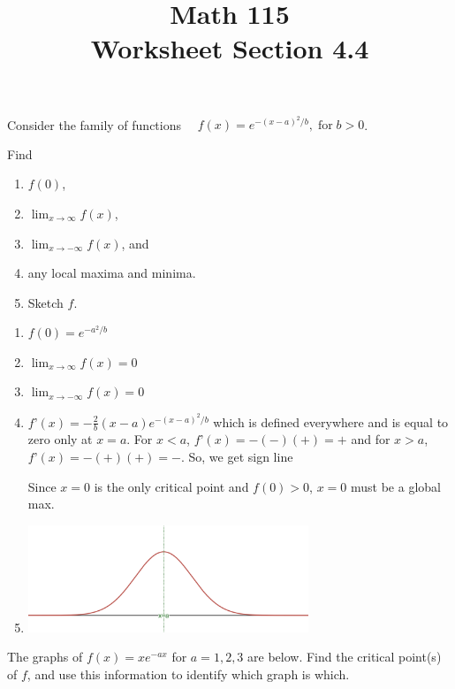 \documentclass[11pt]{exam}
\title{\vspace{-0.5in} Math 115 \\ Worksheet Section 4.4}
\date{}
\begin{document}
\maketitle
\vspace{-0.75in}
\begin{questions}
  \question Consider the family of functions $\quad f(x) = e^{-(x-a)^2/b}, \; \text{for} \; b>0$.

    Find
    \begin{enumerate}
    \item \(f(0)\),
    \item $\displaystyle \lim_{x\to\infty}f(x)$,
    \item $\displaystyle \lim_{x\to-\infty} f(x)$, and
    \item any local maxima and minima.
    \item Sketch \(f\).
    \end{enumerate}
    \begin{solution}
      \begin{enumerate}
      \item \(f(0) = e^{-a^2/b}\)
      \item \(\lim_{x \to \infty} f(x) = 0\)
      \item \(\lim_{x \to -\infty} f(x) = 0\)
      \item \(f’(x) = -\frac{2}{b}(x-a) e^{-(x-a)^2/b}\) which is
        defined everywhere and is equal to zero only at \(x=a\).
        For \(x < a\), \(f’(x) = -(-)(+) = +\) and for \(x > a\),
        \(f’(x) = -(+)(+) = -\). So, we get sign line \\
Since \(x=0\) is the only critical point and \(f(0) > 0\), \(x=0\) must
be a global max.
      \item  \includegraphics[width=3.3in]{Figures/bell-curve.png}
      \end{enumerate}
    \end{solution}
    \vspace{1in}
   \question The graphs of $f(x)=xe^{-ax}$ for $a=1,2,3$ are below.  Find the critical point(s) of $f$, and use this information to identify which graph is which.


\end{questions}
\end{document}
